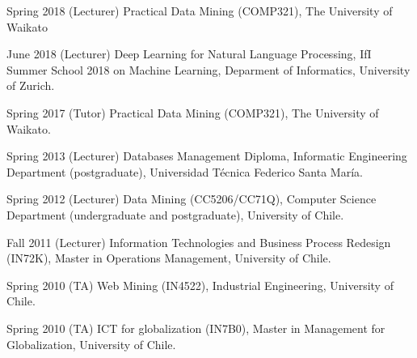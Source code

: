 \documentclass[letterpaper]{article}
\begin{document}
\begin{CV}

\item [Spring 2018] (Lecturer) Practical Data Mining (COMP321), The University of Waikato

\item [June 2018] (Lecturer) Deep Learning for Natural Language Processing, IfI Summer School 2018 on Machine Learning,  Deparment of Informatics, University of Zurich. 

\item[Spring 2017] (Tutor) Practical Data Mining (COMP321), The University of Waikato.

\item[Spring 2013] (Lecturer) Databases Management Diploma, Informatic Engineering Department (postgraduate), Universidad Técnica Federico Santa María.

\item[Spring 2012] (Lecturer) Data Mining (CC5206/CC71Q), Computer Science Department (undergraduate and postgraduate), University of Chile.

\item[Fall 2011]   (Lecturer) Information Technologies and Business Process Redesign (IN72K), Master in Operations Management, University of Chile.

\item[Spring 2010]  (TA) Web Mining (IN4522), Industrial Engineering, University of Chile.

\item[Spring 2010]  (TA) ICT for globalization (IN7B0), Master in Management for Globalization, University of Chile.


\end{CV}
\end{document}
